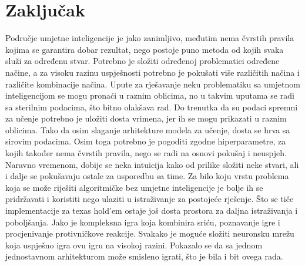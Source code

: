 \section{Zaključak}
Područje umjetne inteligencije je jako zanimljivo, međutim nema čvrstih pravila kojima se garantira dobar rezultat, nego postoje puno metoda od kojih svaka služi za određenu stvar. Potrebno je složiti određenoj problematici određene načine, a za visoku razinu uspješnosti potrebno je pokušati više različitih načina i različite kombinacije načina. Upute za rješavanje neku problematiku sa umjetnom inteligencijom se mogu pronaći u raznim oblicima, no u takvim uputama se radi sa sterilnim podacima, što bitno olakšava rad. Do trenutka da su podaci spremni za učenje potrebno je uložiti dosta vrimena, jer ih se mogu prikazati u raznim oblicima. Tako da osim slaganje arhitekture modela za učenje, dosta se hrva sa sirovim podacima. Osim toga potrebno je pogoditi zgodne hiperparametre, za kojih također nema čvrstih pravila, nego se radi na osnovi pokušaj i neuspjeh. Naravno vremenom, dobije se neka intuicija kako od prilike složiti neke stvari, ali i dalje se pokušavaju ostale za usporedbu sa time. Za bilo koju vrstu problema koja se može riješiti algoritmičke bez umjetne inteligencije je bolje ih se pridržavati i koristiti nego ulaziti u istraživanje za postojeće rješenje. Što se tiče implementacije za texas hold'em ostaje još dosta prostora za daljna istraživanja i poboljšanja. Jako je kompleksna igra koja kombinira sriću, poznavanje igre i procjenivanje protivničkove reakcije. Svakako je moguće složiti neuronsku mrežu koja uspješno igra ovu igru na visokoj razini. Pokazalo se da sa jednom jednostavnom arhitekturom može smisleno igrati, što je bila i bit ovega rada.
